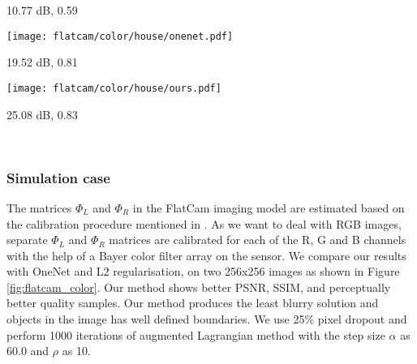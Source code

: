 \documentclass[journal,twoside]{IEEEtran}
\begin{document}
\begin{figure*}[!t]
\begin{minipage}{\textwidth}
\begin{minipage}{.18\textwidth}
\centerline{ 10.77 dB, 0.59}
\end{minipage}\hspace{0.1cm}
\begin{minipage}{.18\textwidth}
\vspace{0.1cm}
\texttt{[image: flatcam/color/house/onenet.pdf]}  
  
\centerline{ 19.52 dB, 0.81}
\end{minipage}\hspace{0.1cm}
\begin{minipage}{.18\textwidth}
\vspace{0.1cm}
\texttt{[image: flatcam/color/house/ours.pdf]}  
\centerline{ 25.08 dB, 0.83}
\end{minipage}\\

\end{minipage}
    \caption{ Reconstructions ($256\times 256$) from simulated FlatCam measurements using L2 regularization, OneNet and our approach. Note the suppression of vignetting effect in our results which is clearly visible in the house image.}
    \label{fig:flatcam_color}
\end{figure*}

\subsubsection{Simulation case}
The matrices $\Phi_L$ and $\Phi_R$ in the FlatCam imaging model are estimated based on the calibration procedure mentioned in \cite{asif2017flatcam}. As we want to deal with RGB images, separate $\Phi_L$ and $\Phi_R$ matrices are calibrated for each of the R, G and B channels with the help of a Bayer color filter array on the sensor. We compare our results with OneNet and L2 regularisation, on two 256x256 images as shown in Figure \ref{fig:flatcam_color}. Our method shows better PSNR, SSIM, and perceptually better quality samples. Our method produces the least blurry solution and objects in the image has well defined boundaries. We use 25$\%$ pixel dropout and perform 1000 iterations of augmented Lagrangian method with the step size $\alpha$ as $60.0$ and $\rho$ as 10. 
\end{document}
